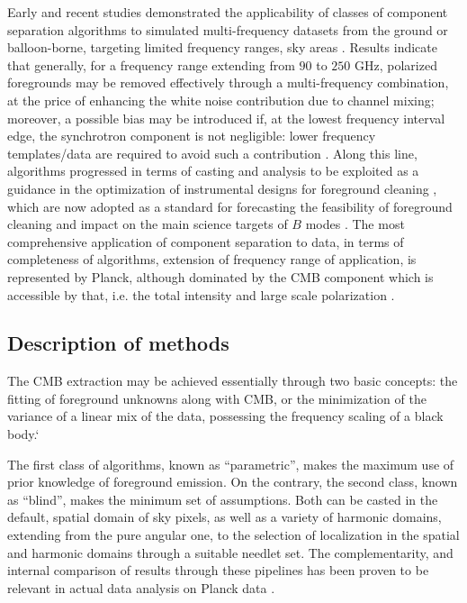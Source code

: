 Early and recent studies demonstrated the applicability of classes of component separation 
algorithms to simulated multi-frequency datasets from the ground or balloon-borne, targeting limited frequency ranges, sky areas \cite{stivoli10,fantaye11,fantaye12}. Results indicate that generally, for a frequency range extending from $90$ to $250$ GHz, polarized foregrounds may be removed effectively through a multi-frequency combination, at the price of enhancing the white noise contribution due to channel mixing; moreover, a possible bias may be introduced if, at the lowest frequency interval edge, the synchrotron component is not negligible: lower frequency templates/data are required to avoid such a contribution \cite{essinger14}. Along this line, algorithms progressed in terms of casting and analysis to be exploited as a guidance in the optimization of instrumental designs for foreground cleaning \cite{errard11, errard12}, which are now adopted as a standard for forecasting the feasibility of foreground cleaning and impact on the main science targets of $B$ modes \cite{errard15b}. The most comprehensive application of component separation to data, in terms of completeness of algorithms, extension of frequency range of application, is represented by Planck, although dominated by the CMB component  which is accessible by that, i.e. the total intensity and large scale polarization \cite{planck15-9}.

\subsection{Description of methods}

The CMB extraction may be achieved essentially through two basic concepts: the fitting of foreground unknowns along with CMB, or the minimization of the variance of a linear mix of the data, possessing the frequency scaling of a black body.`

The first class of algorithms, known as ``parametric'', makes the maximum use of prior knowledge of foreground emission. On the contrary, the second class, known as ``blind'', makes the minimum set of assumptions. Both can be casted in the default, spatial domain of sky pixels, as well as a variety of harmonic domains, extending from the pure angular one, to the selection of localization in the spatial and harmonic domains through a suitable needlet set. The complementarity, and internal comparison of results through these pipelines has been proven to be relevant in actual data analysis on Planck data \cite{planck15-9}. 

